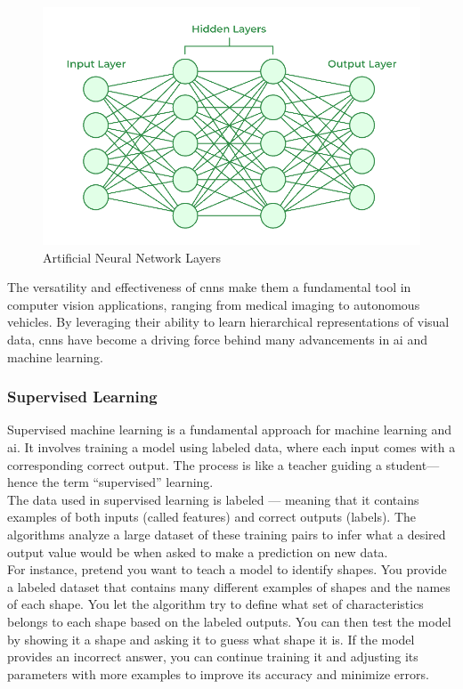 \begin{figure}[h!]
    \centering
    \includegraphics[width=0.75\linewidth]{figures//theory/artificial-neural-network.png}
    \caption{Artificial Neural Network Layers}
    \label{fig:artificial-neural-network}
\end{figure}

The versatility and effectiveness of \glspl{cnn} make them a fundamental tool in computer vision applications, ranging from medical imaging to autonomous vehicles. By leveraging their ability to learn hierarchical representations of visual data, \glspl{cnn} have become a driving force behind many advancements in \gls{ai} and machine learning.


\subsubsection*{Supervised Learning}

Supervised machine learning is a fundamental approach for machine learning and \gls{ai}. It involves training a model using labeled data, where each input comes with a corresponding correct output. The process is like a teacher guiding a student—hence the term “supervised” learning. \cite{geeksforgeeks:supervised-learning} \\

The data used in supervised learning is labeled — meaning that it contains examples of both inputs (called features) and correct outputs (labels). The algorithms analyze a large dataset of these training pairs to infer what a desired output value would be when asked to make a prediction on new data. \cite{google:supervised-learning} \\

For instance, pretend you want to teach a model to identify shapes. You provide a labeled dataset that contains many different examples of shapes and the names of each shape. You let the algorithm try to define what set of characteristics belongs to each shape based on the labeled outputs. You can then test the model by showing it a shape and asking it to guess what shape it is. If the model provides an incorrect answer, you can continue training it and adjusting its parameters with more examples to improve its accuracy and minimize errors. \cite{google:supervised-learning} \\ 

